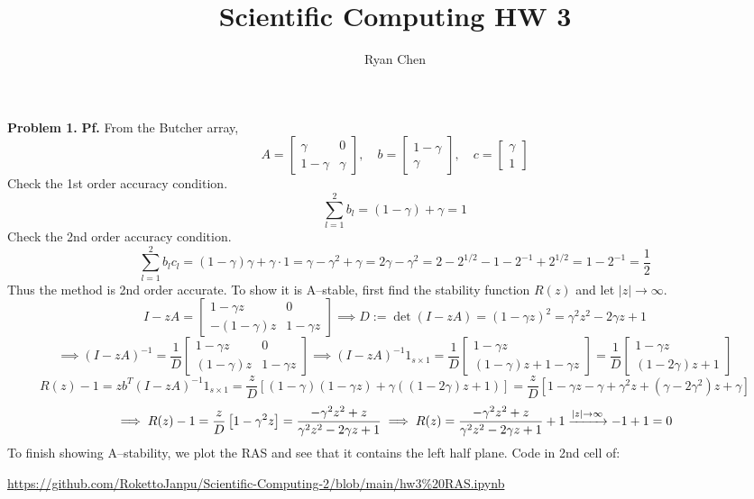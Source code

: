 \documentclass{article}
\title{Scientific Computing HW 3}
\author{Ryan Chen}
\def\tbf#1{\textbf{#1}}
\newcommand{\sbr}[1]{\left[#1\right]}
\newcommand{\m}[2][b]{\begin{#1matrix}#2\end{#1matrix}}
\newcommand{\inv}{^{-1}}
\newcommand{\pf}{\tbf{Pf. }}
\newcommand{\imp}{\implies}
\begin{document}
\maketitle



\tbf{Problem 1.} \pf From the Butcher array,
$$A = \m{\gamma & 0 \\ 1-\gamma & \gamma},
\quad b = \m{1-\gamma \\ \gamma},
\quad c = \m{\gamma \\ 1}$$
Check the 1st order accuracy condition.
$$\sum_{l=1}^2 b_l = (1-\gamma)+\gamma = 1$$
Check the 2nd order accuracy condition.
$$\sum_{l=1}^2 b_lc_l = (1-\gamma)\gamma+\gamma\cdot 1
= \gamma-\gamma^2+\gamma
= 2\gamma-\gamma^2
= 2-2^{1/2}-1-2\inv+2^{1/2}
= 1-2\inv
= \frac12$$
Thus the method is 2nd order accurate. To show it is A--stable, first find the stability function $R(z)$ and let $|z|\to\infty$. 
$$I - zA = \m{1-\gamma z & 0 \\ -(1-\gamma)z & 1-\gamma z}
\imp D := \det(I-zA) = (1-\gamma z)^2 = \gamma^2z^2 - 2\gamma z+1$$
$$\imp (I-zA)\inv = \frac1D\m{1-\gamma z & 0 \\ (1-\gamma)z & 1-\gamma z}
\imp (I-zA)\inv 1_{s\times 1} = \frac1D\m{1-\gamma z \\ (1-\gamma)z+1-\gamma z} = \frac1D\m{1-\gamma z \\ (1-2\gamma)z+1}$$
$$R(z) - 1 = zb^T(I-zA)\inv 1_{s\times 1} = \frac zD\sbr{(1-\gamma)(1-\gamma z)+\gamma((1-2\gamma)z+1)}
= \frac zD\sbr{1-\gamma z-\gamma+\gamma^2z+(\gamma-2\gamma^2)z+\gamma}$$
$$\imp R(z) - 1 = \frac zD\sbr{1-\gamma^2z}
= \frac{-\gamma^2z^2+z}{\gamma^2z^2-2\gamma z+1}
\imp R(z) = \frac{-\gamma^2z^2+z}{\gamma^2z^2-2\gamma z+1} + 1 \app[|z|] -1+1 = 0$$
To finish showing A--stability, we plot the RAS and see that it contains the left half plane. Code in 2nd cell of:  

\url{https://github.com/RokettoJanpu/Scientific-Computing-2/blob/main/hw3%20RAS.ipynb}
\end{document}
